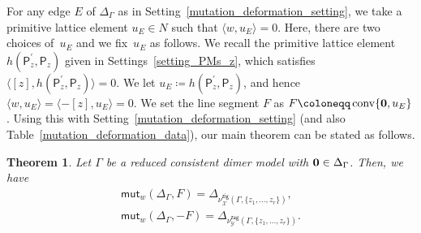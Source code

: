 \documentclass[pdftex]{sigma}%
\numberwithin{equation}{section}
\numberwithin{figure}{section}
\numberwithin{table}{section}
\newtheorem{Theorem}{Theorem}[section]
\newcommand{\calX}{\mathcal{X}}
\newcommand{\calY}{\mathcal{Y}}
\newcommand{\sfP}{\mathsf{P}}
\newcommand{\zig}{\mathsf{zig}}
\newcommand{\zag}{\mathsf{zag}}
\newcommand{\mutation}{\mathsf{mut}}
\begin{document}
For any edge $E$ of $\Delta_\Gamma$ as in Setting~\ref{mutation_deformation_setting}, we take a primitive lattice element $u_E\in N$ such that $\langle w,u_E\rangle=0$.
Here, there are two choices of~$u_E$ and we fix~$u_E$ as follows.
We recall the primitive lattice element $h(\sfP^\prime_z,\sfP_z)$ given in Settings~\ref{setting_PMs_z}, which satisfies $\langle[z],h(\sfP^\prime_z,\sfP_z)\rangle=0$.
We let $u_E\coloneqq h(\sfP^\prime_z,\sfP_z)$, and hence $\langle w,u_E\rangle=\langle-[z],u_E\rangle=0$.
We set the line segment $F$ as $F\coloneqq \operatorname{conv}\{{\bf 0},u_E\}$.
Using this with Setting~\ref{mutation_deformation_setting} (and also Table~\ref{mutation_deformation_data}),
our main theorem can be stated as follows.

\begin{Theorem}\label{mutation=deformation}
Let $\Gamma$ be a reduced consistent dimer model with ${\bf 0}\in\Delta_\Gamma$.
Then, we have
\begin{gather*}
\mutation_{w}(\Delta_\Gamma,F)=\Delta_{\nu^\zig_\calX(\Gamma,\{z_1,\dots,z_r\})},\\
\mutation_{w}(\Delta_\Gamma,-F)=\Delta_{\nu^\zag_\calY(\Gamma,\{z_1,\dots,z_r\})}.
\end{gather*}
\end{Theorem}
\end{document}
